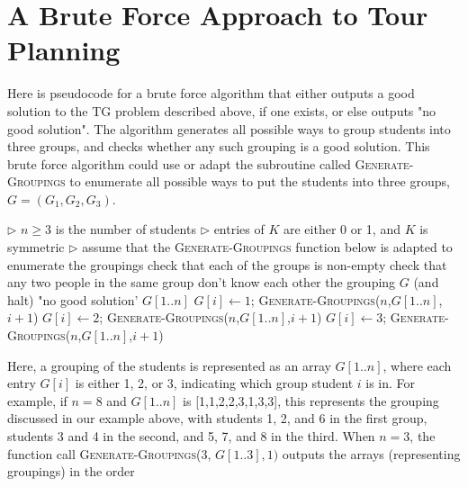 \documentclass[11pt,fleqn]{exam}
\begin{document}
\clearpage

\section{A Brute Force Approach to Tour Planning}
Here is pseudocode for a brute force algorithm that either outputs a good solution to the TG problem described above, if one exists, or else outputs "no good solution". The algorithm generates all possible ways to group students into three groups, and checks whether any such grouping is a good solution. This brute force algorithm could use or adapt the subroutine called \textsc{Generate-Groupings} to enumerate all possible ways to put the students into three groups, $G = (G_1,G_2,G_3)$. 

\vspace{.2in}

\begin{algorithmic}[1]
\State $\triangleright$ $n \ge 3$ is the number of students
\State $\triangleright$ entries of $K$ are either 0 or 1, and $K$ is symmetric
\Statex
{}
   \State $\triangleright$ assume that the \textsc{Generate-Groupings} function below is adapted to enumerate the groupings
    \State check that each of the groups is non-empty
    \State check that any two people in the same group don't know each other
       the grouping $G$ (and halt) 
      \EndIf
\EndFor
{} "no good solution'
\EndFunction
\State
{}
    \Return $G[1..n]$
\Else
   \State $G[i] \gets 1$; \textsc{Generate-Groupings}($n$,$G[1..n]$,$i+1$)
   \State $G[i] \gets 2$; \textsc{Generate-Groupings}($n$,$G[1..n]$,$i+1$)
   \State $G[i] \gets 3$; \textsc{Generate-Groupings}($n$,$G[1..n]$,$i+1$)
\EndIf
   \EndFunction
\end{algorithmic}

\vspace{.2in}

\noindent
Here, a grouping of the students is represented as an array $G[1..n]$, where each entry $G[i]$ is either 1, 2, or 3, indicating which group student $i$ is in. For example, if $n = 8$ and $G[1..n]$ is [1,1,2,2,3,1,3,3], this represents the grouping discussed in our example above, with students 1, 2, and 6 in the first group, students 3 and 4 in the second, and 5, 7, and 8 in the third.
When $n=3$, the function call \textsc{Generate-Groupings}(3, $G[1..3], 1)$ outputs the arrays (representing groupings) in the order
\end{document}
